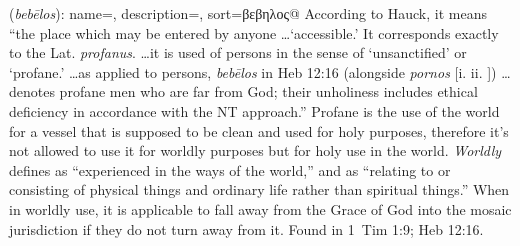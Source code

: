 \item[Profane,]

(\textit{bebēlos}):
{
    name=,
    description={},
    sort=βεβηλος@
}
According to Hauck, it means ``the place which may be entered by anyone \ldots `accessible.' It corresponds exactly to the Lat. \emph{profanus}. \ldots it is used of persons in the sense of `unsanctified' or `profane.' \ldots as applied to persons, \emph{bebēlos} in Heb 12:16 (alongside \emph{pornos} [i.  ii. ]) \ldots denotes profane men who are far from God; their unholiness includes ethical deficiency in accordance with the NT approach.''
Profane is the use of the world for a vessel that is supposed to be clean and used for holy purposes, therefore it's not allowed to use it for worldly purposes but for holy use in the world.
\emph{Worldly} defines as ``experienced in the ways of the world,'' and as ``relating to or consisting of physical things and ordinary life rather than spiritual things.'' When in worldly use, it is applicable to fall away from the Grace of God into the mosaic jurisdiction if they do not turn away from it.
Found in 1~Tim 1:9; Heb 12:16.
